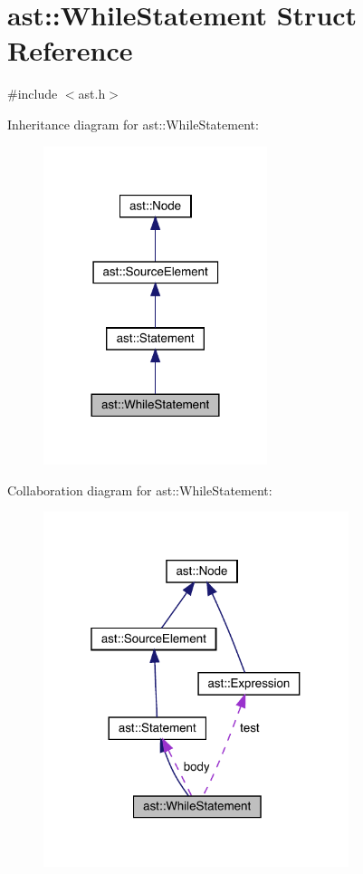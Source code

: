 \hypertarget{structast_1_1_while_statement}{}\section{ast\+:\+:While\+Statement Struct Reference}
\label{structast_1_1_while_statement}


{\ttfamily \#include $<$ast.\+h$>$}



Inheritance diagram for ast\+:\+:While\+Statement\+:\nopagebreak
\begin{figure}[H]
\begin{center}
\leavevmode
\includegraphics[width=185pt]{structast_1_1_while_statement__inherit__graph}
\end{center}
\end{figure}


Collaboration diagram for ast\+:\+:While\+Statement\+:\nopagebreak
\begin{figure}[H]
\begin{center}
\leavevmode
\includegraphics[width=253pt]{structast_1_1_while_statement__coll__graph}
\end{center}
\end{figure}

